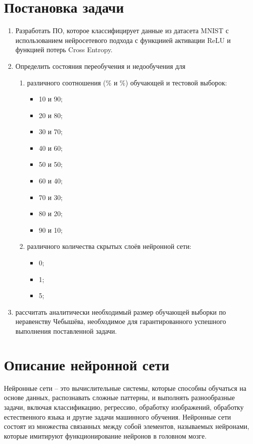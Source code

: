 \documentclass[12pt]{report}
\begin{document}
\section{Постановка задачи} 
\begin{enumerate}
    \item Разработать ПО, которое классифицирует данные из датасета MNIST \cite{bib:mnist} с использованием нейросетевого подхода с функциией активации ReLU и функцией потерь Cross Entropy.

    \item Определить состояния переобучения и недообучения для

    \begin{enumerate}
        \item различного соотношения (\% и \%) обучающей и тестовой выборок:
        \begin{itemize}
            \item 10 и 90;
            \item 20 и 80;
            \item 30 и 70;
            \item 40 и 60;
            \item 50 и 50;
            \item 60 и 40;
            \item 70 и 30;
            \item 80 и 20;
            \item 90 и 10;
        \end{itemize}
        \item различного количества скрытых слоёв нейронной сети:
        \begin{itemize}
            \item 0;
            \item 1;
            \item 5;
        \end{itemize}
    \end{enumerate} 

    \item  рассчитать аналитически необходимый размер обучающей выборки по неравенству Чебышёва, необходимое для гарантированного успешного выполнения поставленной задачи.
\end{enumerate} 

\section{Описание нейронной сети}
Нейронные сети -- это вычислительные системы, которые способны обучаться на основе данных, распознавать сложные паттерны, и выполнять разнообразные задачи, включая классификацию, регрессию, обработку изображений, обработку естественного языка и другие задачи машинного обучения.
Нейронные сети состоят из множества связанных между собой элементов, называемых нейронами, которые имитируют функционирование нейронов в головном мозге.
\end{document}
